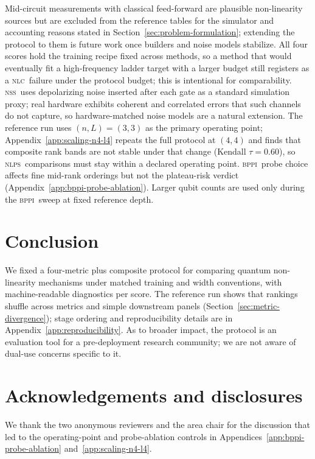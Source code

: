 \documentclass{article}
\newcommand{\nlc}{\textsc{nlc}}
\newcommand{\bppi}{\textsc{bppi}}
\newcommand{\nss}{\textsc{nss}}
\newcommand{\nlps}{\textsc{nlps}}
\begin{document}
Mid-circuit measurements with classical feed-forward are plausible non-linearity sources but are excluded from the reference tables for the simulator and accounting reasons stated in Section~\ref{sec:problem-formulation}; extending the protocol to them is future work once builders and noise models stabilize.
All four scores hold the training recipe fixed across methods, so a method that would eventually fit a high-frequency ladder target with a larger budget still registers as a \nlc\ failure under the protocol budget; this is intentional for comparability.
\nss\ uses depolarizing noise inserted after each gate as a standard simulation proxy; real hardware exhibits coherent and correlated errors that such channels do not capture, so hardware-matched noise models are a natural extension.
The reference run uses $(n, L) = (3, 3)$ as the primary operating point; Appendix~\ref{app:scaling-n4-l4} repeats the full protocol at $(4, 4)$ and finds that composite rank bands are not stable under that change (Kendall $\tau = 0.60$), so \nlps\ comparisons must stay within a declared operating point.
\bppi\ probe choice affects fine mid-rank orderings but not the plateau-risk verdict (Appendix~\ref{app:bppi-probe-ablation}).
Larger qubit counts are used only during the \bppi\ sweep at fixed reference depth.


\section{Conclusion}
\label{sec:conclusion}

We fixed a four-metric plus composite protocol for comparing quantum non-linearity mechanisms under matched training and width conventions, with machine-readable diagnostics per score.
The reference run shows that rankings shuffle across metrics and simple downstream panels (Section~\ref{sec:metric-divergence}); stage ordering and reproducibility details are in Appendix~\ref{app:reproducibility}.
As to broader impact, the protocol is an evaluation tool for a pre-deployment research community; we are not aware of dual-use concerns specific to it.

\section*{Acknowledgements and disclosures}

We thank the two anonymous reviewers and the area chair for the discussion that led to the operating-point and probe-ablation controls in Appendices~\ref{app:bppi-probe-ablation} and~\ref{app:scaling-n4-l4}.
\end{document}
